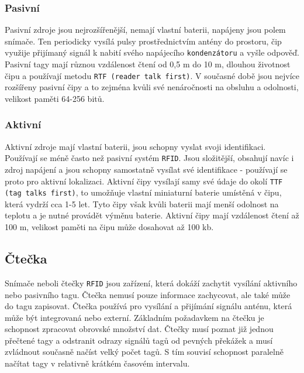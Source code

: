 \documentclass[czech,BP]{thesiskiv}
\begin{document}
\subsubsection{Pasivní}
Pasivní zdroje jsou nejrozšířenější, nemají vlastní baterii, napájeny jsou polem snímače. Ten periodicky vysílá pulsy prostřednictvím antény do prostoru, čip využije přijímaný signál k nabití svého napájecího \texttt{kondenzátoru} a vyšle odpověď. Pasivní tagy mají různou vzdálenost čtení od 0,5 m do 10 m, dlouhou životnost čipu a používají metodu \texttt{RTF (reader talk first)}. V současné době jsou nejvíce rozšířeny pasivní čipy a to zejména kvůli své nenáročnosti na obsluhu a odolnosti, velikost paměti 64-256 bitů.\cite{dolevcek2010identifikace}


\subsubsection{Aktivní}
Aktivní zdroje mají vlastní baterii, jsou schopny vyslat svoji identifikaci. Používají se méně často než pasivní systém \texttt{RFID}. Jsou složitější, obsahují navíc i zdroj napájení a jsou schopny samostatně vysílat své identifikace - používají se proto pro aktivní lokalizaci.
Aktivní čipy vysílají samy své údaje do okolí \texttt{TTF (tag talks first)}, to umožňuje vlastní miniaturní baterie umístěná v čipu, která vydrží cca 1-5 let. Tyto čipy však kvůli baterii mají menší odolnost na teplotu a je nutné provádět výměnu baterie. Aktivní čipy mají vzdálenost čtení až 100 m, velikost paměti na čipu může dosahovat až 100 kb.\cite{dolevcek2010identifikace}


\subsection{Čtečka}
Snímače neboli čtečky \texttt{RFID} jsou zařízení, která dokáží zachytit vysílání aktivního nebo pasivního tagu. Čtečka nemusí pouze informace zachycovat, ale také může do tagu zapisovat. Čtečka používá pro vysílání a přijímání signálu anténu, která může být integrovaná nebo externí. Základním požadavkem na čtečku je schopnost zpracovat obrovské množství dat. Čtečky musí poznat již jednou přečtené tagy a odstranit odrazy signálů tagů od pevných překážek a musí zvládnout současně načíst velký počet tagů. S tím souvisí schopnost paralelně načítat tagy v relativně krátkém časovém intervalu.\cite{dolevcek2010identifikace}	
	
	
	
	
	
\end{document}

